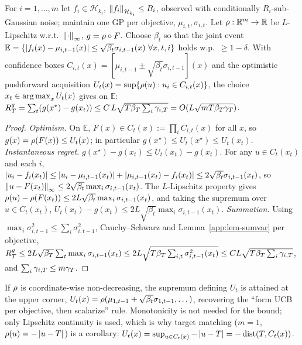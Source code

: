 \begin{theorem}
\label{app:thm-pushforward}
For $i=1,\dots,m$ let $f_i\in\mathcal H_{k_i}$, $\left\lVert f_i\right\rVert_{\mathcal H_{k_i}}\le B_i$,
observed with conditionally $R_i$-sub-Gaussian noise; maintain one GP per
objective, $\mu_{i,t},\sigma_{i,t}$. Let $\rho:\mathbb{R}^m\to\mathbb{R}$ be $L$-Lipschitz w.r.t.\
$\left\lVert \cdot\right\rVert_\infty$, $g=\rho\circ F$. Choose $\beta_t$ so that the joint event
$\mathbb E=\{\left\lvert f_i(x)-\mu_{i,t-1}(x)\right\rvert\le\sqrt{\beta_t}\sigma_{i,t-1}(x)\
\forall x,t,i\}$ holds w.p.\ $\ge1-\delta$. With confidence boxes
$C_{i,t}(x)=[\mu_{i,t-1}\pm\sqrt{\beta_t}\sigma_{i,t-1}](x)$ and the optimistic
pushforward acquisition $U_t(x)=\sup\{\rho(u):u_i\in C_{i,t}(x)\}$, the choice
$x_t\in\operatorname*{arg\,max}_x U_t(x)$ gives on $\mathbb E$:
$R_T^g=\sum_t(g(x^\star)-g(x_t))\le C\,L\sqrt{T\beta_T\sum_i\gamma_{i,T}}
=O(L\sqrt{mT\beta_T\gamma_T})$.
\end{theorem}

\begin{proof}
\emph{Optimism.} On $\mathbb E$, $F(x)\in C_t(x):=\prod_i C_{i,t}(x)$ for all $x$,
so $g(x)=\rho(F(x))\le U_t(x)$; in particular
$g(x^\star)\le U_t(x^\star)\le U_t(x_t)$.
\emph{Instantaneous regret.} $g(x^\star)-g(x_t)\le U_t(x_t)-g(x_t)$. For any
$u\in C_t(x_t)$ and each $i$, $\left\lvert u_i-f_i(x_t)\right\rvert\le\left\lvert u_i-\mu_{i,t-1}(x_t)\right\rvert
+\left\lvert \mu_{i,t-1}(x_t)-f_i(x_t)\right\rvert\le2\sqrt{\beta_t}\sigma_{i,t-1}(x_t)$, so
$\left\lVert u-F(x_t)\right\rVert_\infty\le2\sqrt{\beta_t}\max_i\sigma_{i,t-1}(x_t)$. The
$L$-Lipschitz property gives
$\rho(u)-\rho(F(x_t))\le2L\sqrt{\beta_t}\max_i\sigma_{i,t-1}(x_t)$, and taking the
supremum over $u\in C_t(x_t)$,
$U_t(x_t)-g(x_t)\le2L\sqrt{\beta_t}\max_i\sigma_{i,t-1}(x_t)$.
\emph{Summation.} Using $\max_i\sigma_{i,t-1}^2\le\sum_i\sigma_{i,t-1}^2$,
Cauchy--Schwarz and Lemma~\ref{app:lem-sumvar} per objective,
$R_T^g\le2L\sqrt{\beta_T}\sum_t\max_i\sigma_{i,t-1}(x_t)
\le2L\sqrt{T\beta_T\sum_{i,t}\sigma_{i,t-1}^2(x_t)}
\le CL\sqrt{T\beta_T\sum_i\gamma_{i,T}}$, and $\sum_i\gamma_{i,T}\le m\gamma_T$.
\end{proof}

\begin{remark}
If $\rho$ is coordinate-wise non-decreasing, the supremum defining $U_t$ is
attained at the upper corner,
$U_t(x)=\rho(\mu_{1,t-1}+\sqrt{\beta_t}\sigma_{1,t-1},\dots)$, recovering the
``form UCB per objective, then scalarize'' rule. Monotonicity is not needed for
the bound; only Lipschitz continuity is used, which is why target matching
($m=1$, $\rho(u)=-\left\lvert u-T\right\rvert$) is a corollary:
$U_t(x)=\sup_{u\in C_t(x)}-\left\lvert u-T\right\rvert=-\operatorname{dist}(T,C_t(x))$.
\end{remark}

